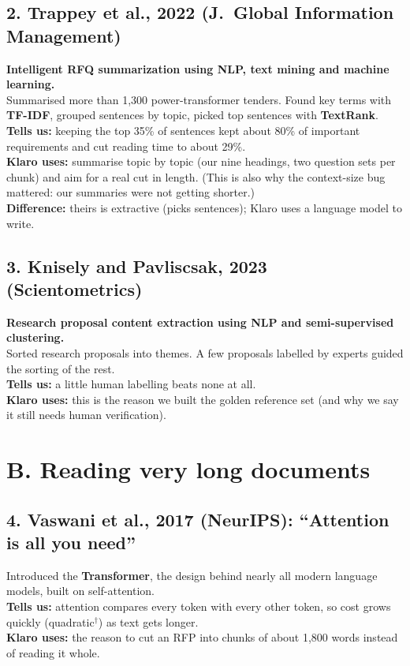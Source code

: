 \subsection*{2. Trappey et al., 2022 (J.\ Global Information Management)}
\textbf{Intelligent RFQ summarization using NLP, text mining and machine learning.}\\
Summarised more than 1,300 power-transformer tenders. Found key terms with \textbf{TF-IDF}, grouped sentences by topic, picked top sentences with \textbf{TextRank}.\\
\textbf{Tells us:} keeping the top 35\% of sentences kept about 80\% of important requirements and cut reading time to about 29\%.\\
\textbf{Klaro uses:} summarise topic by topic (our nine headings, two question sets per chunk) and aim for a real cut in length. (This is also why the context-size bug mattered: our summaries were not getting shorter.)\\
\textbf{Difference:} theirs is extractive (picks sentences); Klaro uses a language model to write.

\subsection*{3. Knisely and Pavliscsak, 2023 (Scientometrics)}
\textbf{Research proposal content extraction using NLP and semi-supervised clustering.}\\
Sorted research proposals into themes. A few proposals labelled by experts guided the sorting of the rest.\\
\textbf{Tells us:} a little human labelling beats none at all.\\
\textbf{Klaro uses:} this is the reason we built the golden reference set (and why we say it still needs human verification).

\section{B. Reading very long documents}

\subsection*{4. Vaswani et al., 2017 (NeurIPS): ``Attention is all you need''}
Introduced the \textbf{Transformer}, the design behind nearly all modern language models, built on self-attention.\\
\textbf{Tells us:} attention compares every token with every other token, so cost grows quickly (quadratic$^\dagger$) as text gets longer.\\
\textbf{Klaro uses:} the reason to cut an RFP into chunks of about 1,800 words instead of reading it whole.

